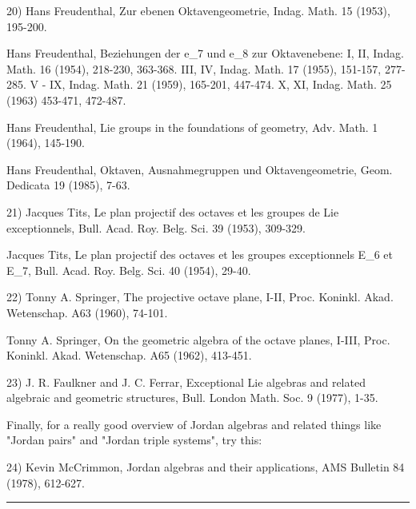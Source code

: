 20) Hans Freudenthal, Zur ebenen Oktavengeometrie, Indag. Math. 15
(1953), 195-200.  
  
Hans Freudenthal, Beziehungen der e_{7} und e_{8} 
zur Oktavenebene:
I, II, Indag. Math. 16 (1954), 218-230, 363-368.  
III, IV, Indag. Math. 17 (1955), 151-157, 277-285.  
V - IX, Indag. Math. 21 (1959), 165-201, 447-474.  
X, XI, Indag. Math. 25 (1963) 453-471, 472-487.  
  
Hans Freudenthal, Lie groups in the foundations of geometry, Adv.
Math. 1 (1964), 145-190.  
  
Hans Freudenthal, Oktaven, Ausnahmegruppen und Oktavengeometrie,
Geom. Dedicata 19 (1985), 7-63.   

21) Jacques Tits, Le plan projectif des octaves et les groupes de Lie
exceptionnels, Bull. Acad. Roy. Belg. Sci. 39 (1953), 309-329.

Jacques Tits, Le plan projectif des octaves et les groupes exceptionnels
E_{6} et E_{7}, Bull. Acad. Roy. Belg. Sci. 40 (1954), 29-40.

22) Tonny A. Springer, The projective octave plane, I-II, Proc. Koninkl.
Akad. Wetenschap. A63 (1960), 74-101.
 
Tonny A. Springer, On the geometric algebra of the octave planes, I-III,
Proc. Koninkl. Akad. Wetenschap. A65 (1962), 413-451.

23) J. R. Faulkner and J. C. Ferrar, Exceptional Lie algebras and related
algebraic and geometric structures, Bull. London Math. Soc. 9 (1977),
1-35.  

Finally, for a really good overview of Jordan algebras and related
things like "Jordan pairs" and "Jordan triple
systems", try this:

24) Kevin McCrimmon, Jordan algebras and their applications, AMS Bulletin
84 (1978), 612-627.










 \par\noindent\rule{\textwidth}{0.4pt}

